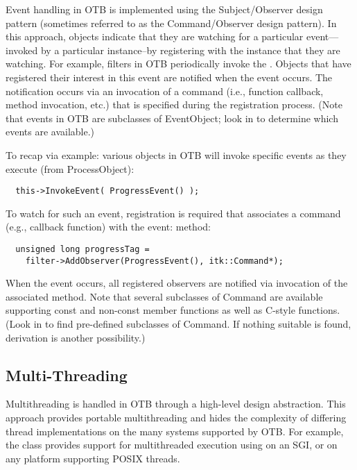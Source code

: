 
Event handling in OTB is implemented using the Subject/Observer design
pattern \cite{Gamma1995} (sometimes referred to as the Command/Observer
design pattern). In this approach, objects indicate that they are watching
for a particular event---invoked by a particular instance--by registering
with the instance that they are watching.  For example, filters in OTB
periodically invoke the . Objects that have registered
their interest in this event are notified when the event occurs. The
notification occurs via an invocation of a command (i.e., function callback,
method invocation, etc.) that is specified during the registration
process. (Note that events in OTB are subclasses of EventObject; look
in  to determine which events are available.)

To recap via example: various objects in OTB will invoke specific events
as they execute (from ProcessObject):
\small
\begin{verbatim}
  this->InvokeEvent( ProgressEvent() );
\end{verbatim}
\normalsize

To watch for such an event, registration is required that associates a
command (e.g., callback function) with the event:
 method:
\small
\begin{verbatim}
  unsigned long progressTag = 
    filter->AddObserver(ProgressEvent(), itk::Command*);
\end{verbatim}
\normalsize

When the event occurs, all registered observers are notified via invocation
of the associated  method. Note that several
subclasses of Command are available supporting const and
non-const member functions as well as C-style functions. (Look in
 to find pre-defined subclasses of
Command. If nothing suitable is found, derivation is another
possibility.)

\subsection{Multi-Threading}
\label{sec:MultiThreading}

Multithreading is handled in OTB through a high-level design
abstraction. This approach provides portable multithreading and hides the
complexity of differing thread implementations on the many systems supported
by OTB. For example, the class  provides support for
multithreaded execution using  on an SGI, or
 on any platform supporting POSIX threads. 

